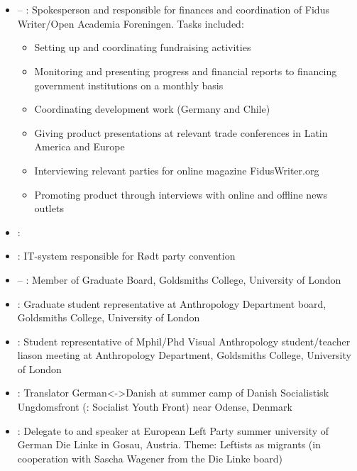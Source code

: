 \section*{\organizationexperience}

\begin{itemize}
\item {} – : Spokesperson and responsible for finances and coordination of Fidus Writer/Open Academia Foreningen. Tasks included:
\begin{itemize}
\item Setting up and coordinating fundraising activities
\item Monitoring and presenting progress and financial reports to financing government institutions on a monthly basis
\item Coordinating development work (Germany and Chile)
\item Giving product presentations at relevant trade conferences in Latin America and Europe
\item Interviewing relevant parties for online magazine FidusWriter.org
\item Promoting product through interviews with online and offline news outlets
\end{itemize}
\item {}: 
\item {}: IT-system responsible for Rødt party convention
\item {} –  : Member of Graduate Board, Goldsmiths College, University of London
\item {}: Graduate student representative at Anthropology Department board, Goldsmiths College, University of London
\item {}: Student representative of Mphil/Phd Visual Anthropology student/teacher liason meeting at Anthropology Department, Goldsmiths College, University of London
\item {}: Translator German<->Danish at summer camp of Danish Socialistisk Ungdomsfront (\english: Socialist Youth Front) near Odense, Denmark
\item {}: Delegate to and speaker at European Left Party summer university of German Die Linke in Gosau, Austria. Theme: Leftists as migrants (in cooperation with Sascha Wagener from the Die Linke board)

\end{itemize}
